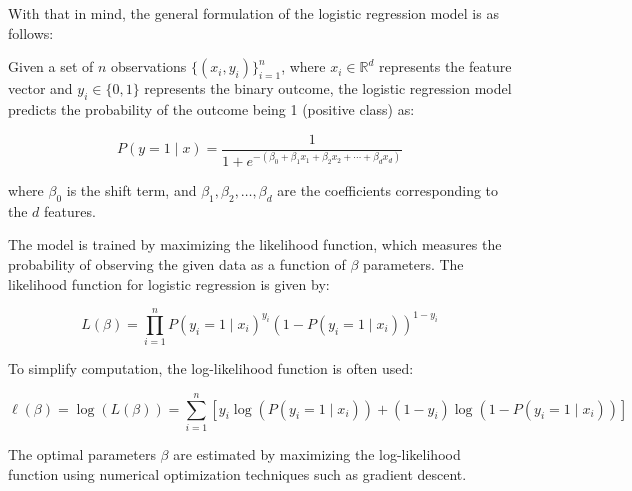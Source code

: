 With that in mind, the general formulation of the logistic regression model is as follows:

Given a set of \(n\) observations \(\{(x_i, y_i)\}_{i=1}^n\), where \(x_i \in \mathbb{R}^d\) represents the feature vector and \(y_i \in \{0, 1\}\) represents the binary outcome, the logistic regression model predicts the probability of the outcome being 1 (positive class) as:

\[
	P(y = 1 \mid x) = \frac{1}{1 + e^{-(\beta_0 + \beta_1 x_1 + \beta_2 x_2 + \cdots + \beta_d x_d)}}
\]

where \(\beta_0\) is the shift term,
and \(\beta_1, \beta_2, \ldots, \beta_d\) are the coefficients corresponding to the \(d\) features.

The model is trained by maximizing the likelihood function, which measures the probability of observing the given data as a function of \(\beta\) parameters. The likelihood function for logistic regression is given by:

\[
	L(\beta) = \prod_{i=1}^n P(y_i = 1 \mid x_i)^{y_i} (1 - P(y_i = 1 \mid x_i))^{1 - y_i}
\]

To simplify computation, the log-likelihood function is often used:

\[
	\ell(\beta) = \log(L(\beta)) = \sum_{i=1}^n \left[ y_i \log(P(y_i = 1 \mid x_i)) + (1 - y_i) \log(1 - P(y_i = 1 \mid x_i)) \right]
\]

The optimal parameters \(\beta\) are estimated by maximizing the log-likelihood function using numerical optimization techniques such as gradient descent.








